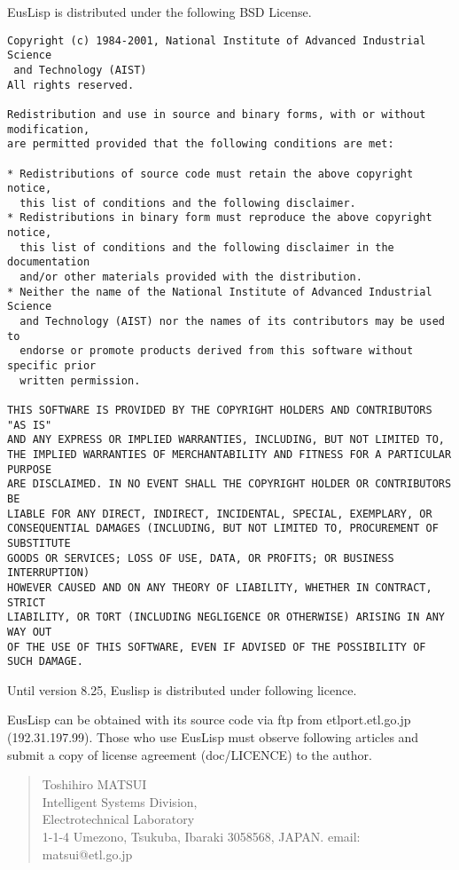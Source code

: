 EusLisp is distributed under the following BSD License.

\begin{verbatim}
Copyright (c) 1984-2001, National Institute of Advanced Industrial Science
 and Technology (AIST)
All rights reserved.

Redistribution and use in source and binary forms, with or without modification,
are permitted provided that the following conditions are met:

* Redistributions of source code must retain the above copyright notice,
  this list of conditions and the following disclaimer.
* Redistributions in binary form must reproduce the above copyright notice,
  this list of conditions and the following disclaimer in the documentation
  and/or other materials provided with the distribution.
* Neither the name of the National Institute of Advanced Industrial Science
  and Technology (AIST) nor the names of its contributors may be used to 
  endorse or promote products derived from this software without specific prior 
  written permission.

THIS SOFTWARE IS PROVIDED BY THE COPYRIGHT HOLDERS AND CONTRIBUTORS "AS IS" 
AND ANY EXPRESS OR IMPLIED WARRANTIES, INCLUDING, BUT NOT LIMITED TO, 
THE IMPLIED WARRANTIES OF MERCHANTABILITY AND FITNESS FOR A PARTICULAR PURPOSE 
ARE DISCLAIMED. IN NO EVENT SHALL THE COPYRIGHT HOLDER OR CONTRIBUTORS BE 
LIABLE FOR ANY DIRECT, INDIRECT, INCIDENTAL, SPECIAL, EXEMPLARY, OR 
CONSEQUENTIAL DAMAGES (INCLUDING, BUT NOT LIMITED TO, PROCUREMENT OF SUBSTITUTE 
GOODS OR SERVICES; LOSS OF USE, DATA, OR PROFITS; OR BUSINESS INTERRUPTION) 
HOWEVER CAUSED AND ON ANY THEORY OF LIABILITY, WHETHER IN CONTRACT, STRICT 
LIABILITY, OR TORT (INCLUDING NEGLIGENCE OR OTHERWISE) ARISING IN ANY WAY OUT 
OF THE USE OF THIS SOFTWARE, EVEN IF ADVISED OF THE POSSIBILITY OF SUCH DAMAGE.
\end{verbatim}

Until version 8.25, Euslisp is distributed under following licence.

EusLisp can be obtained with its source code via ftp from
etlport.etl.go.jp (192.31.197.99).
Those who use EusLisp must observe  following articles
and submit a copy of license agreement (doc/LICENCE) to the author.
\begin{quote}
\begin{tabbing}
Toshihiro MATSUI \hspace{50mm} \= \\
Intelligent Systems Division, \>  \\
Electrotechnical Laboratory  \>  \\
1-1-4 Umezono,
Tsukuba, Ibaraki 3058568, JAPAN. \> email: matsui@etl.go.jp \\
\end{tabbing}
\end{quote}

